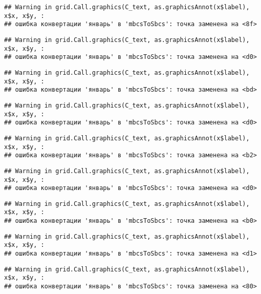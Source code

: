 \documentclass[
]{article}
\begin{document}
\begin{verbatim}
## Warning in grid.Call.graphics(C_text, as.graphicsAnnot(x$label), x$x, x$y, :
## ошибка конвертации 'январь' в 'mbcsToSbcs': точка заменена на <8f>
\end{verbatim}

\begin{verbatim}
## Warning in grid.Call.graphics(C_text, as.graphicsAnnot(x$label), x$x, x$y, :
## ошибка конвертации 'январь' в 'mbcsToSbcs': точка заменена на <d0>
\end{verbatim}

\begin{verbatim}
## Warning in grid.Call.graphics(C_text, as.graphicsAnnot(x$label), x$x, x$y, :
## ошибка конвертации 'январь' в 'mbcsToSbcs': точка заменена на <bd>
\end{verbatim}

\begin{verbatim}
## Warning in grid.Call.graphics(C_text, as.graphicsAnnot(x$label), x$x, x$y, :
## ошибка конвертации 'январь' в 'mbcsToSbcs': точка заменена на <d0>
\end{verbatim}

\begin{verbatim}
## Warning in grid.Call.graphics(C_text, as.graphicsAnnot(x$label), x$x, x$y, :
## ошибка конвертации 'январь' в 'mbcsToSbcs': точка заменена на <b2>
\end{verbatim}

\begin{verbatim}
## Warning in grid.Call.graphics(C_text, as.graphicsAnnot(x$label), x$x, x$y, :
## ошибка конвертации 'январь' в 'mbcsToSbcs': точка заменена на <d0>
\end{verbatim}

\begin{verbatim}
## Warning in grid.Call.graphics(C_text, as.graphicsAnnot(x$label), x$x, x$y, :
## ошибка конвертации 'январь' в 'mbcsToSbcs': точка заменена на <b0>
\end{verbatim}

\begin{verbatim}
## Warning in grid.Call.graphics(C_text, as.graphicsAnnot(x$label), x$x, x$y, :
## ошибка конвертации 'январь' в 'mbcsToSbcs': точка заменена на <d1>
\end{verbatim}

\begin{verbatim}
## Warning in grid.Call.graphics(C_text, as.graphicsAnnot(x$label), x$x, x$y, :
## ошибка конвертации 'январь' в 'mbcsToSbcs': точка заменена на <80>
\end{verbatim}
\end{document}
